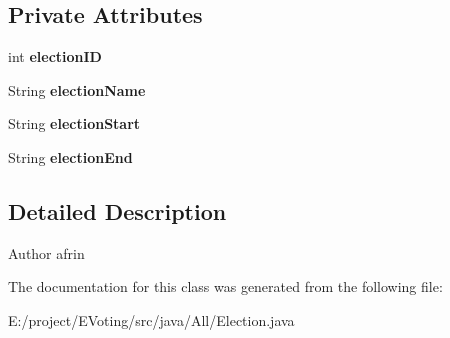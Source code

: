 \subsection*{Private Attributes}
\begin{DoxyCompactItemize}
\item 
\mbox{\label{class_models_1_1_election_aa14345524202e73ffae091c301976219}} 
int {\bfseries election\+ID}
\item 
\mbox{\label{class_models_1_1_election_a55b3509b9c3ecc38a96d914625dbf0fd}} 
String {\bfseries election\+Name}
\item 
\mbox{\label{class_models_1_1_election_a7c7516dd68c8078a5da3c3b7a26ae8e2}} 
String {\bfseries election\+Start}
\item 
\mbox{\label{class_models_1_1_election_aa08ff71e81d45e592120c43a987d429e}} 
String {\bfseries election\+End}
\end{DoxyCompactItemize}


\subsection{Detailed Description}
\begin{DoxyAuthor}{Author}
afrin 
\end{DoxyAuthor}


The documentation for this class was generated from the following file\+:\begin{DoxyCompactItemize}
\item 
E\+:/project/\+E\+Voting/src/java/\+All/Election.\+java\end{DoxyCompactItemize}
